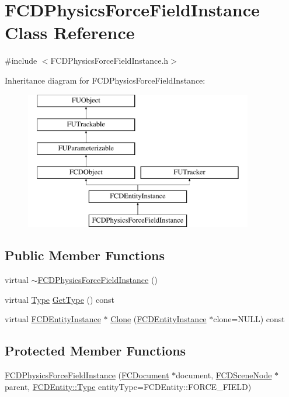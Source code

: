 \hypertarget{classFCDPhysicsForceFieldInstance}{
\section{FCDPhysicsForceFieldInstance Class Reference}
\label{classFCDPhysicsForceFieldInstance}
}


{\ttfamily \#include $<$FCDPhysicsForceFieldInstance.h$>$}

Inheritance diagram for FCDPhysicsForceFieldInstance:\begin{figure}[H]
\begin{center}
\leavevmode
\includegraphics[height=6.000000cm]{classFCDPhysicsForceFieldInstance}
\end{center}
\end{figure}
\subsection*{Public Member Functions}
\begin{DoxyCompactItemize}
\item 
virtual \hyperlink{classFCDPhysicsForceFieldInstance_a538a834fe14a1aee5541f1d7b8a33d32}{$\sim$FCDPhysicsForceFieldInstance} ()
\item 
virtual \hyperlink{classFCDEntityInstance_a82e95eec7d9242bbedb336b0d35b59d3}{Type} \hyperlink{classFCDPhysicsForceFieldInstance_a6c7921f3ba25d5236877ddf966a67886}{GetType} () const 
\item 
virtual \hyperlink{classFCDEntityInstance}{FCDEntityInstance} $\ast$ \hyperlink{classFCDPhysicsForceFieldInstance_a94639f782500a04f469aaf7ed3154d3f}{Clone} (\hyperlink{classFCDEntityInstance}{FCDEntityInstance} $\ast$clone=NULL) const 
\end{DoxyCompactItemize}
\subsection*{Protected Member Functions}
\begin{DoxyCompactItemize}
\item 
\hyperlink{classFCDPhysicsForceFieldInstance_a3526e93c73189268805f024bf1cf8331}{FCDPhysicsForceFieldInstance} (\hyperlink{classFCDocument}{FCDocument} $\ast$document, \hyperlink{classFCDSceneNode}{FCDSceneNode} $\ast$parent, \hyperlink{classFCDEntity_a9301a4bd5f4d4190ec13e40db4effdd7}{FCDEntity::Type} entityType=FCDEntity::FORCE\_\-FIELD)
\end{DoxyCompactItemize}
